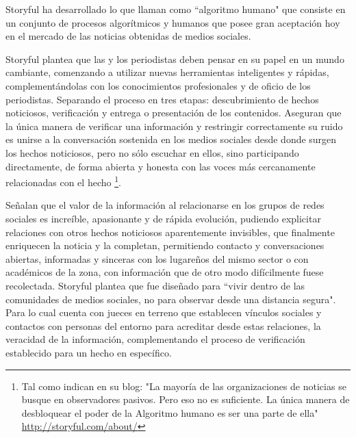 
Storyful ha desarrollado lo que llaman como ``algoritmo humano" que consiste en un conjunto de procesos algorítmicos y humanos que posee gran aceptación hoy en el mercado de las noticias obtenidas de medios sociales. 

Storyful plantea que las y los periodistas deben pensar en su papel en un mundo cambiante, comenzando a utilizar nuevas herramientas inteligentes y rápidas, complementándolas con los conocimientos profesionales y de oficio de los periodistas. Separando el proceso en tres etapas: descubrimiento de hechos noticiosos, verificación y entrega o presentación de los contenidos. Aseguran que la única manera de verificar una información y restringir correctamente su ruido es unirse a la conversación sostenida en los medios sociales desde donde surgen los hechos noticiosos,  pero no sólo escuchar en ellos, sino participando directamente, de forma abierta y honesta con las voces más cercanamente relacionadas con el hecho \footnote{Tal como indican en su blog: "La mayoría de las organizaciones de noticias se busque en observadores pasivos. Pero eso no es suficiente. La única manera de desbloquear el poder de la Algoritmo humano es ser una parte de ella" \url{http://storyful.com/about/}}.

Señalan que el valor de la información al relacionarse en los grupos de redes sociales es increíble, apasionante y de rápida evolución, pudiendo explicitar relaciones con otros hechos noticiosos aparentemente invisibles, que finalmente enriquecen la noticia y la completan, permitiendo contacto y conversaciones abiertas, informadas y sinceras con los lugareños del mismo sector o con académicos de la zona, con información que de otro modo difícilmente fuese recolectada. Storyful plantea que fue diseñado para ``vivir dentro de las comunidades de medios sociales, no para observar desde una distancia segura". Para lo cual cuenta con jueces en terreno que establecen vínculos sociales y contactos con personas del entorno para acreditar desde estas relaciones, la veracidad de la información, complementando el proceso de verificación establecido para un hecho en específico.

